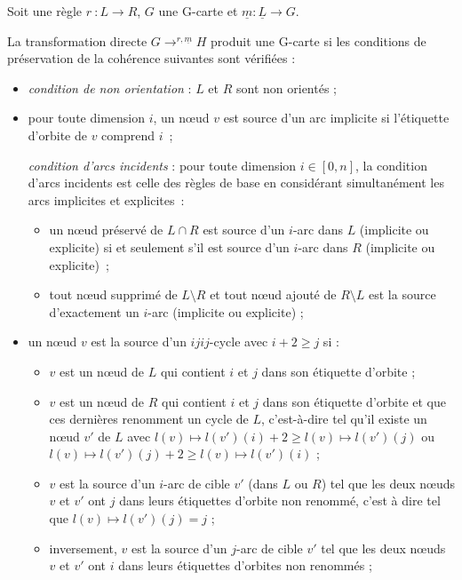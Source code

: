 Soit une règle $r~: L \longrightarrow R$, $G$ une G-carte et $\underline{m} : \underline{L} \rightarrow G$.

La transformation directe $G \longrightarrow^{r, \underline{m}} H$ produit une G-carte si les conditions de préservation de la cohérence suivantes sont vérifiées :
\begin{itemize}
	\item \emph{condition de non orientation} : $L$ et $R$ sont non orientés ;

	\item pour toute dimension $i$, un nœud $v$ est source d'un arc implicite si l'étiquette d'orbite de $v$ comprend $i$~;

	      \emph{condition d'arcs incidents} : pour toute dimension $i \in [0, n]$, la condition d'arcs incidents est celle des règles de base en considérant simultanément les arcs implicites et explicites~:
	      \begin{itemize}
		      \item un nœud préservé de $L \cap R$ est  source d'un $i$-arc dans $L$ (implicite ou explicite) si et seulement s'il est  source d'un $i$-arc dans $R$ (implicite ou explicite)~;
		      \item tout nœud supprimé de $L \setminus R$ et tout nœud ajouté de $R \setminus L$ est la source d'exactement un $i$-arc (implicite ou explicite) ;
	      \end{itemize}

	\item un nœud $v$ est la source d'un $ijij$-cycle avec $i+2 \geq j$ si :
	      \begin{itemize}
		      \item $v$ est un nœud de $L$ qui contient $i$ et $j$ dans son étiquette d'orbite ;
		      \item $v$ est un nœud de $R$ qui contient $i$ et $j$ dans son étiquette d'orbite et que ces dernières renomment un cycle de $L$, c'est-à-dire tel qu'il existe un nœud $v'$ de $L$ avec $l(v) \mapsto l(v') (i) +2 \geq l(v) \mapsto l(v') (j)$ ou $l(v) \mapsto l(v') (j) +2 \geq l(v) \mapsto l(v') (i)$ ;
		      \item $v$ est la source d'un $i$-arc de cible $v'$ (dans $L$ ou $R$) tel que les deux nœuds $v$ et $v'$ ont $j$ dans leurs étiquettes d'orbite non renommé, c'est à dire tel que $l(v) \mapsto l(v') (j) = j$ ;
		      \item inversement, $v$ est la source d'un $j$-arc de cible $v'$ tel que les deux nœuds $v$ et $v'$ ont $i$ dans leurs étiquettes d'orbites non renommés ;
	      \end{itemize}


\end{itemize}

